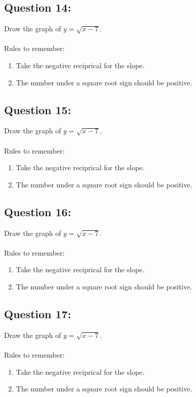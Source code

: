 \documentclass[12pt, letterpaper]{article}
\begin{document}
\subsection{Question 14:}
  Draw the graph of $y=\sqrt{x-7}$.
  \\\\
  Rules to remember:
  \begin{enumerate}
    \item Take the negative reciprical for the slope.
    \item The number under a square root sign should be positive.
  \end{enumerate}

\subsection{Question 15:}
  Draw the graph of $y=\sqrt{x-7}$.
  \\\\
  Rules to remember:
  \begin{enumerate}
    \item Take the negative reciprical for the slope.
    \item The number under a square root sign should be positive.
  \end{enumerate}

\subsection{Question 16:}
  Draw the graph of $y=\sqrt{x-7}$.
  \\\\
  Rules to remember:
  \begin{enumerate}
    \item Take the negative reciprical for the slope.
    \item The number under a square root sign should be positive.
  \end{enumerate}

\subsection{Question 17:}
  Draw the graph of $y=\sqrt{x-7}$.
  \\\\
  Rules to remember:
  \begin{enumerate}
    \item Take the negative reciprical for the slope.
    \item The number under a square root sign should be positive.
  \end{enumerate}
\end{document}
